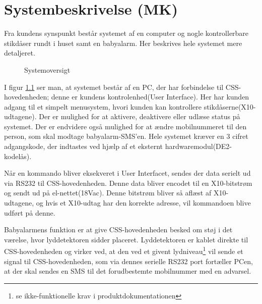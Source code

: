 \chapter{Systembeskrivelse (MK)}

Fra kundens synspunkt består systemet af en computer og nogle kontrollerbare stikdåser rundt i huset samt en babyalarm. Her beskrives hele systemet mere detaljeret.

\begin{figure}[H] \centering
{}
\caption{Systemoversigt}
\label{fig:sys_oversigt}
\end{figure}

I figur \ref{fig:sys_oversigt} ser man, at systemet består af en PC, der har forbindelse til CSS-hovedenheden; denne er kundens kontrolenhed(User Interface). Her har kunden adgang til et simpelt menusystem, hvori kunden kan kontrollere stikdåserne(X10-udtagene). Der er mulighed for at aktivere, deaktivere eller udlæse status på systemet. Der er endvidere også mulighed for at ændre mobilnummeret til den person, som skal modtage babyalarm-SMS'en. Hele systemet kræver en 3 cifret adgangskode, der indtastes ved hjælp af et eksternt hardwaremodul(DE2-kodelås).

Når en kommando bliver eksekveret i User Interfacet, sendes der data serielt ud via RS232 til CSS-hovedenheden. Denne data bliver encodet til en X10-bitstrøm og sendt ud på el-nettet(18Vac). Denne bitstrøm bliver så aflæst af X10-udtagene, og hvis et X10-udtag har den korrekte adresse, vil kommandoen blive udført på denne.

Babyalarmens funktion er at give CSS-hovedenheden besked om støj i det værelse, hvor lyddetektoren sidder placeret. Lyddetektoren er kablet direkte til CSS-hovedenheden og virker ved, at den ved et givent lydniveau\footnote{se ikke-funktionelle krav i produktdokumentationen} vil sende et signal til CSS-hovedenheden, som via dennes serielle RS232 port fortæller PCen, at der skal sendes en SMS til det forudbestemte mobilnummer med en advarsel.


